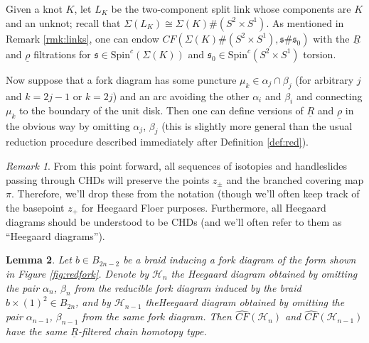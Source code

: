 \documentclass[11pt]{article}
\theoremstyle{plain} \newtheorem{thm}{Theorem}[subsection]
\theoremstyle{plain} \newtheorem{cor}[thm]{Corollary}
\theoremstyle{plain} \newtheorem{prop}[thm]{Proposition}
\theoremstyle{plain} \newtheorem{conj}[thm]{Conjecture}
\theoremstyle{plain} \newtheorem{lem}[thm]{Lemma}
\theoremstyle{definition} \newtheorem{df}[thm]{Definition}
\theoremstyle{remark} \newtheorem{rmk}[thm]{Remark}
\theoremstyle{remark} \newtheorem{obs}[thm]{Observation}
\newcommand{\B}[1]{B_{#1} }
\newcommand{\DBCs}[1]{\Sigma(#1)\#(S^{2}\times S^{1})}
\newcommand{\SxS}{S^{2}\times S^{1}}
\newcommand{\DBC}[1]{\Sigma(#1)}
\newcommand{\h}{\mathcal{H}}
\newcommand{\red}[1]{\underline{#1}}
\numberwithin{equation}{section}
\begin{document}
Given a knot $K$, let $L_{K}$ be the two-component split link whose components are $K$ and an unknot; recall that $\DBC{L_K} \cong \DBCs{K}$.  As mentioned in Remark \ref{rmk:links}, one can endow $\widehat{CF}(\DBCs{K}, \mathfrak{s} \# \mathfrak{s}_{0})$ with the $\red{R}$ and $\red{\rho}$ filtrations for $\mathfrak{s} \in \text{Spin}^{c}(\DBC{K})$ and $\mathfrak{s}_{0} \in \text{Spin}^{c}(\SxS)$ torsion.

Now suppose that a fork diagram has some puncture $\mu_{k} \in \alpha_{j} \cap \beta_{j}$ (for arbitrary $j$ and $k = 2j-1$ or $k=2j$) and an arc avoiding the other $\alpha_i$ and $\beta_i$ and connecting $\mu_k$ to the boundary of the unit disk.  Then one can define versions of  $\red{R}$ and $\red{\rho}$ in the obvious way by omitting $\alpha_{j}$, $\beta_{j}$ (this is slightly more general than the usual reduction procedure described immediately after Definition \ref{def:red}).

\begin{rmk}
From this point forward, all sequences of isotopies and handleslides passing through CHDs will preserve the points $z_{\pm}$ and the branched covering map $\pi$.  Therefore, we'll drop these from the notation (though we'll often keep track of the basepoint $z_+$ for Heegaard Floer purposes.  Furthermore, all Heegaard diagrams should be understood to be CHDs (and we'll often refer to them as ``Heegaard diagrams'').
\end{rmk}

\begin{lem}\label{lem:RredR}
Let $b \in \B{2n-2}$ be a braid inducing a fork diagram of the form shown in Figure \ref{fig:redfork}.  Denote by $\h_{n}$ the Heegaard diagram obtained by omitting the pair $\alpha_{n}$, $\beta_{n}$ from the reducible fork diagram induced by the braid $b \times (1)^{2} \in \B{2n}$, and by $\h_{n-1}$ theHeegaard diagram obtained by omitting the pair $\alpha_{n-1}$, $\beta_{n-1}$ from the same fork diagram.  Then $\widehat{CF}(\h_{n})$ and $\widehat{CF}(\h_{n-1})$ have the same $\red{R}$-filtered chain homotopy type.
\end{lem}
\end{document}
